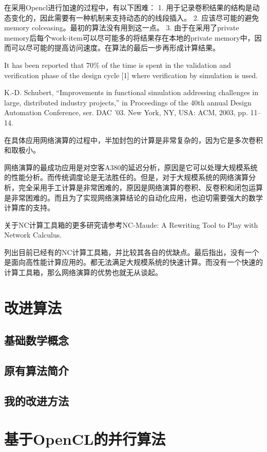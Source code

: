 \documentclass[10pt,journal]{IEEEtran}
\begin{document}
在采用Opencl进行加速的过程中，有以下困难：
1. 用于记录卷积结果的结构是动态变化的，因此需要有一种机制来支持动态的的线段插入。
2. 应该尽可能的避免memory colceasing。最初的算法没有用到这一点。
3. 由于在采用了private memory后每个work-item可以尽可能多的将结果存在本地的private  memory中，因而可以尽可能的提高访问速度。在算法的最后一步再形成计算结果。

It has been reported that 70\% of the time is spent in the validation and verification phase of the design cycle [1] where verification by simulation is used.

K.-D. Schubert, “Improvements in functional simulation addressing
challenges in large, distributed industry projects,” in Proceedings
of the 40th annual Design Automation Conference, ser. DAC ’03.
New York, NY, USA: ACM, 2003, pp. 11–14.

在具体应用网络演算的过程中，半加封包的计算是非常复杂的，因为它是多次卷积和取极小。

网络演算的最成功应用是对空客A380的延迟分析，原因是它可以处理大规模系统的性能分析。而传统调度论是无法胜任的。但是，对于大规模系统的网络演算分析，完全采用手工计算是非常困难的，原因是网络演算的卷积、反卷积和闭包运算是非常困难的。而且为了实现网络演算结论的自动化应用，也迫切需要强大的数学计算库的支持。

关于NC计算工具箱的更多研究请参考NC-Maude: A Rewriting Tool to Play with Network Calculus.

列出目前已经有的NC计算工具箱，并比较其各自的优缺点。最后指出，没有一个是面向高性能计算应用的。都无法满足大规模系统的快速计算。而没有一个快速的计算工具箱，那么网络演算的优势也就无从谈起。

\section{改进算法}
\subsection{基础数学概念}
\subsection{原有算法简介}
\subsection{我的改进方法}

\section{基于OpenCL的并行算法}
\end{document}
